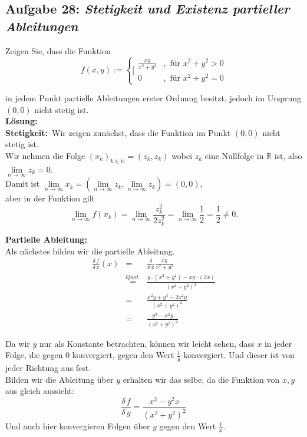 \subsection*{Aufgabe 28: \mdseries\itshape Stetigkeit und Existenz partieller Ableitungen}

Zeigen Sie, dass die Funktion
$$
	f(x,y) := \left\{[ \begin{array}{lr}
		\frac{xy}{x^2+y^2} &, \text{ für } x^2+y^2 > 0\\
		0&, \text{ für } x^2+y^2=0
	\end{array} \right.
$$

in jedem Punkt partielle Ableitungen erster Ordnung besitzt, jedoch im Ursprung $(0,0)$ nicht stetig ist.\\

\textbf{Lösung:}\\

\textbf{Stetigkeit:}\
Wir zeigen zunächst, dass die Funktion im Punkt $(0,0)$ nicht stetig ist.\\

Wir nehmen die Folge $(x_k)_{k\in\mathbb{N}} = (z_k,z_k)$ wobei $z_k$ eine Nullfolge in $\mathbb{R}$ ist, also
$\underset{n \rightarrow \infty}{\lim} z_k = 0$.\\

Damit ist $\underset{n \rightarrow \infty}{\lim} x_k = (\underset{n \rightarrow \infty}{\lim} z_k, \underset{n \rightarrow \infty}{\lim} z_k) = (0,0)$,\\
aber in der Funktion gilt
$$
\underset{n \rightarrow \infty}{\lim} f(x_k) = \underset{n \rightarrow \infty}{\lim} \frac{z_k^2}{2z_k^2} = \underset{n \rightarrow \infty}{\lim} \frac{1}{2} = \frac{1}{2} \neq 0.
$$

\textbf{Partielle Ableitung:}\\
Als nächstes bilden wir die partielle Ableitung.\\

$$\begin{array}{rcl}
	\frac{\delta \, f}{\delta \, x} (x) &=& \frac{\delta}{\delta \, x} \frac{xy}{x^2+y^2}\\
		&\stackrel{Quot.}{=}& \frac{y \cdot (x^2+y^2) - xy \cdot (2x)}{(x^2+y^2)^2}\\
		&=& \frac{x^2y + y^3 - 2x^2y}{(x^2+y^2)^2}\\
		&=& \frac{y^3 - x^2y}{(x^2+y^2)^2}
\end{array}$$

Da wir $y$ nur als Konstante betrachten, können wir leicht sehen, dass $x$ in jeder Folge, die gegen 0 konvergiert, gegen den Wert
$\frac{1}{y}$ konvergiert. Und dieser ist von jeder Richtung aus fest.\\

Bilden wir die Ableitung über $y$ erhalten wir das selbe, da die Funktion von $x,y$ aus gleich aussieht:\\
$$
\frac{\delta \, f}{\delta \, y} = \frac{x^3 - y^2x}{(x^2 + y^2)^2}
$$
Und auch hier konvergieren Folgen über $y$ gegen den Wert $\frac{1}{x}$.


